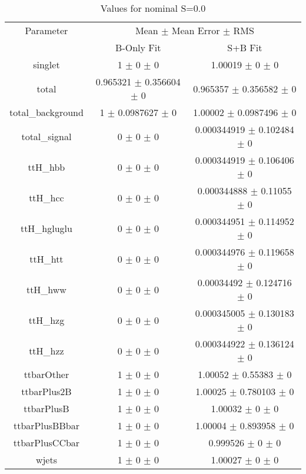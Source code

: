\begin{table}
\centering
\caption{Values for nominal S=0.0}
\begin{tabular}{ccc}
\toprule
Parameter & \multicolumn{2}{c}{Mean $\pm$ Mean Error $\pm$ RMS}\\
 & B-Only Fit & S+B Fit\\
\midrule
singlet & \num{1} $\pm$ \num{0} $\pm$ \num{0} & \num{1.00019} $\pm$ \num{0} $\pm$ \num{0}\\
total & \num{0.965321} $\pm$ \num{0.356604} $\pm$ \num{0} & \num{0.965357} $\pm$ \num{0.356582} $\pm$ \num{0}\\
total\_background & \num{1} $\pm$ \num{0.0987627} $\pm$ \num{0} & \num{1.00002} $\pm$ \num{0.0987496} $\pm$ \num{0}\\
total\_signal & \num{0} $\pm$ \num{0} $\pm$ \num{0} & \num{0.000344919} $\pm$ \num{0.102484} $\pm$ \num{0}\\
ttH\_hbb & \num{0} $\pm$ \num{0} $\pm$ \num{0} & \num{0.000344919} $\pm$ \num{0.106406} $\pm$ \num{0}\\
ttH\_hcc & \num{0} $\pm$ \num{0} $\pm$ \num{0} & \num{0.000344888} $\pm$ \num{0.11055} $\pm$ \num{0}\\
ttH\_hgluglu & \num{0} $\pm$ \num{0} $\pm$ \num{0} & \num{0.000344951} $\pm$ \num{0.114952} $\pm$ \num{0}\\
ttH\_htt & \num{0} $\pm$ \num{0} $\pm$ \num{0} & \num{0.000344976} $\pm$ \num{0.119658} $\pm$ \num{0}\\
ttH\_hww & \num{0} $\pm$ \num{0} $\pm$ \num{0} & \num{0.00034492} $\pm$ \num{0.124716} $\pm$ \num{0}\\
ttH\_hzg & \num{0} $\pm$ \num{0} $\pm$ \num{0} & \num{0.000345005} $\pm$ \num{0.130183} $\pm$ \num{0}\\
ttH\_hzz & \num{0} $\pm$ \num{0} $\pm$ \num{0} & \num{0.000344922} $\pm$ \num{0.136124} $\pm$ \num{0}\\
ttbarOther & \num{1} $\pm$ \num{0} $\pm$ \num{0} & \num{1.00052} $\pm$ \num{0.55383} $\pm$ \num{0}\\
ttbarPlus2B & \num{1} $\pm$ \num{0} $\pm$ \num{0} & \num{1.00025} $\pm$ \num{0.780103} $\pm$ \num{0}\\
ttbarPlusB & \num{1} $\pm$ \num{0} $\pm$ \num{0} & \num{1.00032} $\pm$ \num{0} $\pm$ \num{0}\\
ttbarPlusBBbar & \num{1} $\pm$ \num{0} $\pm$ \num{0} & \num{1.00004} $\pm$ \num{0.893958} $\pm$ \num{0}\\
ttbarPlusCCbar & \num{1} $\pm$ \num{0} $\pm$ \num{0} & \num{0.999526} $\pm$ \num{0} $\pm$ \num{0}\\
wjets & \num{1} $\pm$ \num{0} $\pm$ \num{0} & \num{1.00027} $\pm$ \num{0} $\pm$ \num{0}\\
\bottomrule
\end{tabular}
\end{table}